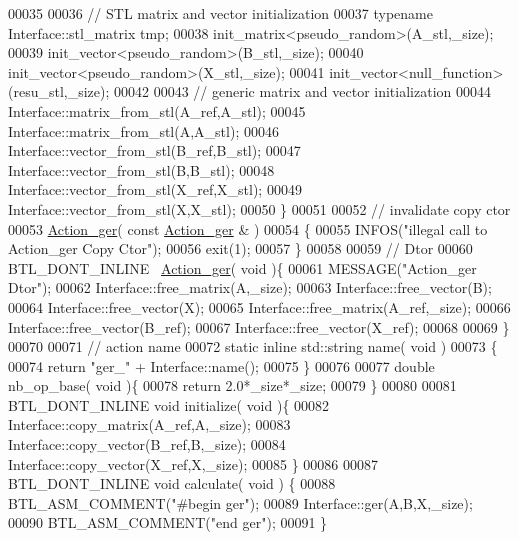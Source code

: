 \begin{DoxyCode}
00035 
00036     \textcolor{comment}{// STL matrix and vector initialization}
00037     \textcolor{keyword}{typename} Interface::stl\_matrix tmp;
00038     init\_matrix<pseudo\_random>(A\_stl,\_size);
00039     init\_vector<pseudo\_random>(B\_stl,\_size);
00040     init\_vector<pseudo\_random>(X\_stl,\_size);
00041     init\_vector<null\_function>(resu\_stl,\_size);
00042 
00043     \textcolor{comment}{// generic matrix and vector initialization}
00044     Interface::matrix\_from\_stl(A\_ref,A\_stl);
00045     Interface::matrix\_from\_stl(A,A\_stl);
00046     Interface::vector\_from\_stl(B\_ref,B\_stl);
00047     Interface::vector\_from\_stl(B,B\_stl);
00048     Interface::vector\_from\_stl(X\_ref,X\_stl);
00049     Interface::vector\_from\_stl(X,X\_stl);
00050   \}
00051 
00052   \textcolor{comment}{// invalidate copy ctor}
00053   \hyperlink{class_action__ger}{Action\_ger}( \textcolor{keyword}{const}  \hyperlink{class_action__ger}{Action\_ger} & )
00054   \{
00055     INFOS(\textcolor{stringliteral}{"illegal call to Action\_ger Copy Ctor"});
00056     exit(1);
00057   \}
00058 
00059   \textcolor{comment}{// Dtor}
00060   BTL\_DONT\_INLINE ~\hyperlink{class_action__ger}{Action\_ger}( \textcolor{keywordtype}{void} )\{
00061     MESSAGE(\textcolor{stringliteral}{"Action\_ger Dtor"});
00062     Interface::free\_matrix(A,\_size);
00063     Interface::free\_vector(B);
00064     Interface::free\_vector(X);
00065     Interface::free\_matrix(A\_ref,\_size);
00066     Interface::free\_vector(B\_ref);
00067     Interface::free\_vector(X\_ref);
00068 
00069   \}
00070 
00071   \textcolor{comment}{// action name}
00072   \textcolor{keyword}{static} \textcolor{keyword}{inline} std::string name( \textcolor{keywordtype}{void} )
00073   \{
00074     \textcolor{keywordflow}{return} \textcolor{stringliteral}{"ger\_"} + Interface::name();
00075   \}
00076 
00077   \textcolor{keywordtype}{double} nb\_op\_base( \textcolor{keywordtype}{void} )\{
00078     \textcolor{keywordflow}{return} 2.0*\_size*\_size;
00079   \}
00080 
00081   BTL\_DONT\_INLINE  \textcolor{keywordtype}{void} initialize( \textcolor{keywordtype}{void} )\{
00082     Interface::copy\_matrix(A\_ref,A,\_size);
00083     Interface::copy\_vector(B\_ref,B,\_size);
00084     Interface::copy\_vector(X\_ref,X,\_size);
00085   \}
00086 
00087   BTL\_DONT\_INLINE \textcolor{keywordtype}{void} calculate( \textcolor{keywordtype}{void} ) \{
00088     BTL\_ASM\_COMMENT(\textcolor{stringliteral}{"#begin ger"});
00089     Interface::ger(A,B,X,\_size);
00090     BTL\_ASM\_COMMENT(\textcolor{stringliteral}{"end ger"});
00091   \}

\end{DoxyCode}
